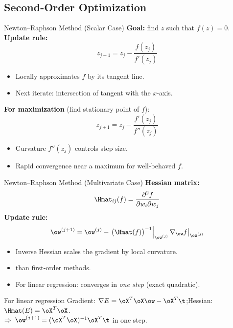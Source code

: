 \subsection{Second-Order Optimization}

\begin{frame}{Newton--Raphson Method (Scalar Case)}
  \textbf{Goal:} find $z$ such that $f(z) = 0$.\\[0.4em]
  \textbf{Update rule:}
  \[
    z_{j+1} = z_j - \frac{f(z_j)}{f'(z_j)}
  \]
  \begin{itemize}
    \item Locally approximates $f$ by its tangent line.
    \item Next iterate: intersection of tangent with the $x$-axis.
  \end{itemize}
  \vspace{0.3cm}
  \textbf{For maximization} (find stationary point of $f$):
  \[
    z_{j+1} = z_j - \frac{f'(z_j)}{f''(z_j)}
  \]
  \begin{itemize}
    \item Curvature $f''(z_j)$ controls step size.
    \item Rapid convergence near a maximum for well-behaved $f$.
  \end{itemize}
\end{frame}

\begin{frame}{Newton--Raphson Method (Multivariate Case)}
  \textbf{Hessian matrix:}
  \[
    \Hmat_{ij}(f) = \frac{\partial^2 f}{\partial w_i \partial w_j}
  \]
  \textbf{Update rule:}
  \[
    \ow^{(j+1)} = \ow^{(j)} - \left.\bigl(\Hmat(f)\bigr)^{-1}\right|_{\ow^{(j)}} \nabla_{\ow}f\big|_{\ow^{(j)}}
  \]
  \begin{itemize}
    \item Inverse Hessian scales the gradient by local curvature.
    \item {} than first-order methods.
    \item For linear regression: converges in \emph{one step} (exact quadratic).
  \end{itemize}
  \vspace{0.2cm}
  \begin{block}{For linear regression}
    Gradient: $\nabla E = \oX^T\oX\ow - \oX^T\t$;\quad Hessian: $\Hmat(E) = \oX^T\oX$.\\
    $\Rightarrow\;\ow^{(j+1)} = (\oX^T\oX)^{-1}\oX^T\t$ in one step.
  \end{block}
\end{frame}

